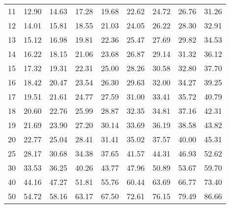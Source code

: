 \begin{center}
\begin{tabular}{r | rrrr | rrrr |}
  \hline
  11 & \footnotesize \footnotesize 12.90 & \footnotesize 14.63 & \footnotesize 17.28 & \footnotesize 19.68 & \footnotesize 22.62 & \footnotesize 24.72 & \footnotesize 26.76 & \footnotesize 31.26 \\ 
  12 & \footnotesize 14.01 & \footnotesize 15.81 & \footnotesize 18.55 & \footnotesize 21.03 & \footnotesize 24.05 & \footnotesize 26.22 & \footnotesize 28.30 & \footnotesize 32.91 \\ 
  13 & \footnotesize 15.12 & \footnotesize 16.98 & \footnotesize 19.81 & \footnotesize 22.36 & \footnotesize 25.47 & \footnotesize 27.69 & \footnotesize 29.82 & \footnotesize 34.53 \\ 
  14 & \footnotesize 16.22 & \footnotesize 18.15 & \footnotesize 21.06 & \footnotesize 23.68 & \footnotesize 26.87 & \footnotesize 29.14 & \footnotesize 31.32 & \footnotesize 36.12 \\ 
  15 & \footnotesize 17.32 & \footnotesize 19.31 & \footnotesize 22.31 & \footnotesize 25.00 & \footnotesize 28.26 & \footnotesize 30.58 & \footnotesize 32.80 & \footnotesize 37.70 \\ 
  \hline
  16 & \footnotesize 18.42 & \footnotesize 20.47 & \footnotesize 23.54 & \footnotesize 26.30 & \footnotesize 29.63 & \footnotesize 32.00 & \footnotesize 34.27 & \footnotesize 39.25 \\ 
  17 & \footnotesize 19.51 & \footnotesize 21.61 & \footnotesize 24.77 & \footnotesize 27.59 & \footnotesize 31.00 & \footnotesize 33.41 & \footnotesize 35.72 & \footnotesize 40.79 \\ 
  18 & \footnotesize 20.60 & \footnotesize 22.76 & \footnotesize 25.99 & \footnotesize 28.87 & \footnotesize 32.35 & \footnotesize 34.81 & \footnotesize 37.16 & \footnotesize 42.31 \\ 
  19 & \footnotesize 21.69 & \footnotesize 23.90 & \footnotesize 27.20 & \footnotesize 30.14 & \footnotesize 33.69 & \footnotesize 36.19 & \footnotesize 38.58 & \footnotesize 43.82 \\ 
  20 & \footnotesize 22.77 & \footnotesize 25.04 & \footnotesize 28.41 & \footnotesize 31.41 & \footnotesize 35.02 & \footnotesize 37.57 & \footnotesize 40.00 & \footnotesize 45.31 \\ 
  \hline
  25 & \footnotesize 28.17 & \footnotesize 30.68 & \footnotesize 34.38 & \footnotesize 37.65 & \footnotesize 41.57 & \footnotesize 44.31 & \footnotesize 46.93 & \footnotesize 52.62 \\ 
  30 & \footnotesize 33.53 & \footnotesize 36.25 & \footnotesize 40.26 & \footnotesize 43.77 & \footnotesize 47.96 & \footnotesize 50.89 & \footnotesize 53.67 & \footnotesize 59.70 \\ 
  40 & \footnotesize 44.16 & \footnotesize 47.27 & \footnotesize 51.81 & \footnotesize 55.76 & \footnotesize 60.44 & \footnotesize 63.69 & \footnotesize 66.77 & \footnotesize 73.40 \\ 
  50 & \footnotesize 54.72 & \footnotesize 58.16 & \footnotesize 63.17 & \footnotesize 67.50 & \footnotesize 72.61 & \footnotesize 76.15 & \footnotesize 79.49 & \footnotesize 86.66 \\ 
  \hline
\end{tabular}
\label{fullChiSqTable}
\end{center}
